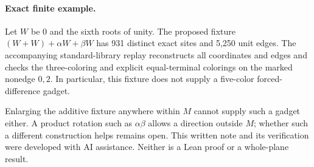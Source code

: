 \documentclass[11pt,letterpaper]{article}
\begin{document}
\paragraph{Exact finite example.}
Let \(W\) be 0 and the sixth roots of unity. The proposed
fixture \((W+W)+\alpha W+\beta W\) has 931 distinct exact sites
and 5,250 unit edges. The accompanying standard-library replay
reconstructs all coordinates and edges and checks the
three-coloring and explicit equal-terminal colorings on the
marked nonedge \(0,2\). In particular, this fixture does not
supply a five-color forced-difference gadget.

Enlarging the additive fixture anywhere within \(M\) cannot
supply such a gadget either. A product rotation such as
\(\alpha\beta\) allows a direction outside \(M\); whether such a
different construction helps remains open.
This written note and its verification were developed with AI
assistance. Neither is a Lean proof or a whole-plane result.
\end{document}
